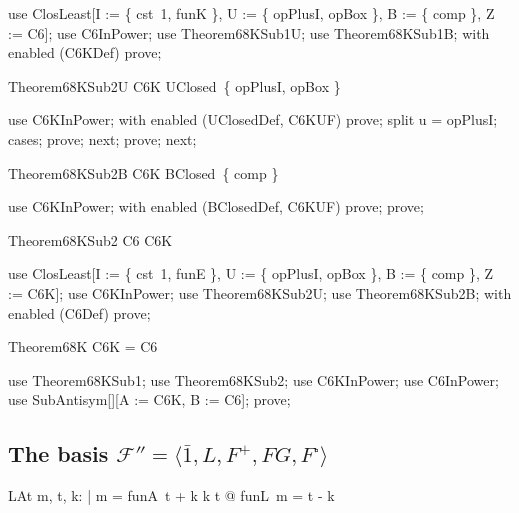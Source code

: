 \documentclass{article}
\begin{document}
\begin{zproof}
use ClosLeast[I := \{ cst~1, funK \}, U := \{ opPlusI, opBox \}, B := \{ comp \}, Z := C6];
use C6InPower;
use Theorem68KSub1U;
use Theorem68KSub1B;
with enabled (C6KDef) prove;
\end{zproof}

\begin{theorem}{Theorem68KSub2U}
  C6K \in UClosed~\{ opPlusI, opBox \}
\end{theorem}

\begin{zproof}
use C6KInPower;
with enabled (UClosedDef, C6KUF) prove;
split u = opPlusI;
cases;
prove;
next;
prove;
next;
\end{zproof}

\begin{theorem}{Theorem68KSub2B}
  C6K \in BClosed~\{ comp \}
\end{theorem}

\begin{zproof}
use C6KInPower;
with enabled (BClosedDef, C6KUF) prove;
prove;
\end{zproof}

\begin{theorem}{Theorem68KSub2}
  C6 \subseteq C6K
\end{theorem}

\begin{zproof}
use ClosLeast[I := \{ cst~1, funE \}, U := \{ opPlusI, opBox \}, B := \{ comp \}, Z := C6K];
use C6KInPower;
use Theorem68KSub2U;
use Theorem68KSub2B;
with enabled (C6Def) prove;
\end{zproof}

\begin{theorem}{Theorem68K}
  C6K = C6
\end{theorem}

\begin{zproof}
use Theorem68KSub1;
use Theorem68KSub2;
use C6KInPower;
use C6InPower;
use SubAntisym[\nat \fun \nat][A := C6K, B := C6];
prove;
\end{zproof}

\subsection{The basis $\mathcal{F}'' = \langle \bar 1, L, F^+, FG, F^\square\rangle$}

\begin{theorem}{LAt}
  \forall m, t, k: \nat | m = funA~t + k \land k \leq t @ funL~m = t - k
\end{theorem}
\end{document}
